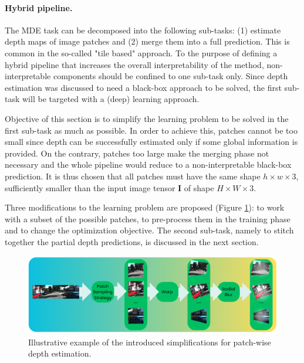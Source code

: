 \paragraph{Hybrid pipeline.}
The MDE task can be decomposed into the following sub-tasks: (1) estimate depth maps of image patches and (2) merge them into a full prediction.
This is common in the so-called "tile based" approach.
To the purpose of defining a hybrid pipeline that increases the overall interpretability of the method, non-interpretable components should be confined to one sub-task only.
Since depth estimation was discussed to need a black-box approach to be solved, the first sub-task will be targeted with a (deep) learning approach.

Objective of this section is to simplify the learning problem to be solved in the first sub-task as much as possible.
In order to achieve this, patches cannot be too small since depth can be successfully estimated only if some global information is provided.
On the contrary, patches too large make the merging phase not necessary and the whole pipeline would reduce to a non-interpretable black-box prediction.
It is thus chosen that all patches must have the same shape $h \times w \times 3$, sufficiently smaller than the input image tensor $\mathbf{I}$ of shape $H \times W \times 3$.

Three modifications to the learning problem are proposed (Figure \ref{fig:simplification}): to work with a subset of the possible patches, to pre-process them in the training phase and to change the optimization objective.
The second sub-task, namely to stitch together the partial depth predictions, is discussed in the next section.

\vspace{0.5cm}

\begin{figure}
    \begin{adjustwidth}{-0.2\textwidth}{-0.2\textwidth}
    \centering
    \includegraphics[scale=0.3]{figs/simplification}
    \end{adjustwidth}
    \caption{
        Illustrative example of the introduced simplifications for patch-wise depth estimation.
        \label{fig:simplification}
    }
\end{figure}

